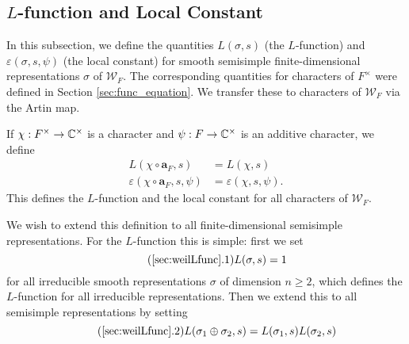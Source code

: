 \subsection{\texorpdfstring{$L$}{TEXT}-function and Local Constant}\label{sec:weilLfunc}
In this subsection, we define the quantities $L(\sigma, s)$ (the $L$-function) and $\varepsilon(\sigma, s, \psi)$ (the local constant) for smooth semisimple finite-dimensional representations $\sigma$ of $\mathcal{W}_F$. The corresponding quantities for characters of $F^\times$ were defined in Section \ref{sec:func_equation}. We transfer these to characters of $\mathcal{W}_F$ via the Artin map.
\begin{defn}\label{defn:LfuncWeil}
	If $\chi: F^\times \to \mathbb{C}^\times$ is a character and $\psi: F\to \mathbb{C}^\times$ is an additive character, we define
	\begin{align*}
		L(\chi\circ\mathbf{a}_F, s) &= L(\chi, s)\\
		\varepsilon(\chi\circ\mathbf{a}_F, s, \psi) &= \varepsilon(\chi, s, \psi).
	\end{align*}
	This defines the $L$-function and the local constant for all characters of $\mathcal{W}_F$.
\end{defn}
We wish to extend this definition to all finite-dimensional semisimple representations. For the $L$-function this is simple: first we set
\begin{equation}\label{eqn:Lweilirrep}\tag{\ref{sec:weilLfunc}.1}
	L(\sigma, s) = 1
\end{equation}
for all irreducible smooth representations $\sigma$ of dimension $n\ge 2$, which defines the $L$-function for all irreducible representations. Then we extend this to all semisimple representations by setting
\begin{equation}\label{eqn:Lweilsum}\tag{\ref{sec:weilLfunc}.2}
	L(\sigma_1\oplus \sigma_2, s) = L(\sigma_1, s)L(\sigma_2, s)
\end{equation}

